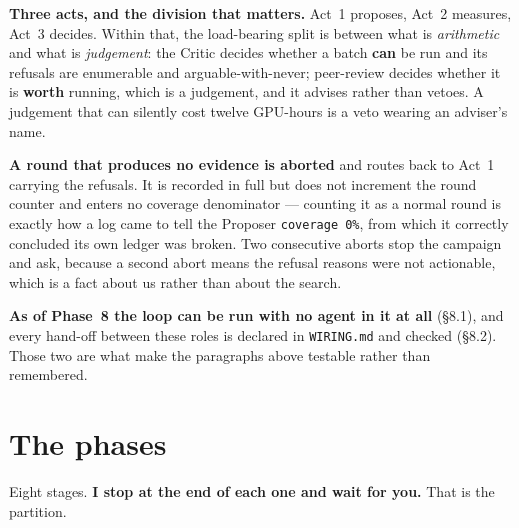 \documentclass[11pt,a4paper]{article}
\newcommand{\code}[1]{\texttt{#1}}
\begin{document}
\textbf{Three acts, and the division that matters.} Act~1 proposes, Act~2 measures, Act~3 decides.
Within that, the load-bearing split is between what is \emph{arithmetic} and what is
\emph{judgement}: the Critic decides whether a batch \textbf{can} be run and its refusals are
enumerable and arguable-with-never; peer-review decides whether it is \textbf{worth} running, which
is a judgement, and it advises rather than vetoes. A judgement that can silently cost twelve
GPU-hours is a veto wearing an adviser's name.

\textbf{A round that produces no evidence is aborted} and routes back to Act~1 carrying the
refusals. It is recorded in full but does not increment the round counter and enters no coverage
denominator --- counting it as a normal round is exactly how a log came to tell the Proposer
\code{coverage 0\%}, from which it correctly concluded its own ledger was broken. Two consecutive
aborts stop the campaign and ask, because a second abort means the refusal reasons were not
actionable, which is a fact about us rather than about the search.

\textbf{As of Phase~8 the loop can be run with no agent in it at all} (\S8.1), and every hand-off
between these roles is declared in \code{WIRING.md} and checked (\S8.2). Those two are what make
the paragraphs above testable rather than remembered.

\section{The phases}

Eight stages. \textbf{I stop at the end of each one and wait for you.} That is the partition.
\end{document}
